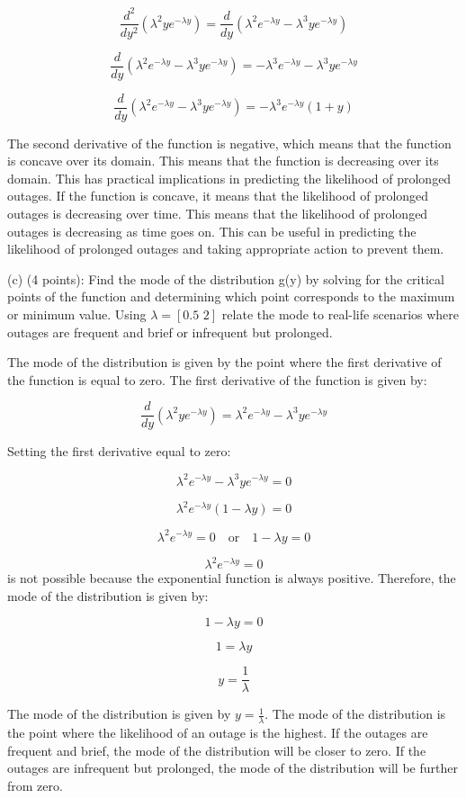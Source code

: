 \documentclass{article}
\begin{document}
\[\frac{d^2}{dy^2}(\lambda^2ye^{-\lambda y}) = \frac{d}{dy}(\lambda^2e^{-\lambda y} - \lambda^3ye^{-\lambda y})\]

\[\frac{d}{dy}(\lambda^2e^{-\lambda y} - \lambda^3ye^{-\lambda y}) = -\lambda^3e^{-\lambda y} - \lambda^3ye^{-\lambda y}\]

\[\frac{d}{dy}(\lambda^2e^{-\lambda y} - \lambda^3ye^{-\lambda y}) = -\lambda^3e^{-\lambda y}(1 + y)\]


The second derivative of the function is negative, which means that the function is concave over its domain. This means that the function is decreasing over its domain. This has practical implications in predicting the likelihood of prolonged outages. If the function is concave, it means that the likelihood of prolonged outages is decreasing over time. This means that the likelihood of prolonged outages is decreasing as time goes on. This can be useful in predicting the likelihood of prolonged outages and taking appropriate action to prevent them.

(c) (4 points): Find the mode of the distribution g(y) by solving for the critical points of the
function and determining which point corresponds to the maximum or minimum value. Using \(\lambda = [\text{0.5 2}]\) relate the mode to real-life scenarios where outages are frequent and brief or infrequent but prolonged.\newline

The mode of the distribution is given by the point where the first derivative of the function is equal to zero. The first derivative of the function is given by:

\[\frac{d}{dy}(\lambda^2ye^{-\lambda y}) = \lambda^2e^{-\lambda y} - \lambda^3ye^{-\lambda y}\]

Setting the first derivative equal to zero:

\[\lambda^2e^{-\lambda y} - \lambda^3ye^{-\lambda y} = 0\]

\[\lambda^2e^{-\lambda y}(1 - \lambda y) = 0\]

\[\lambda^2e^{-\lambda y} = 0 \quad \text{or} \quad 1 - \lambda y = 0\]

\[\lambda^2e^{-\lambda y} = 0\] is not possible because the exponential function is always positive. Therefore, the mode of the distribution is given by:

\[1 - \lambda y = 0\]

\[1 = \lambda y\]

\[y = \frac{1}{\lambda}\]

The mode of the distribution is given by \(y = \frac{1}{\lambda}\). The mode of the distribution is the point where the likelihood of an outage is the highest. If the outages are frequent and brief, the mode of the distribution will be closer to zero. If the outages are infrequent but prolonged, the mode of the distribution will be further from zero.
\end{document}
